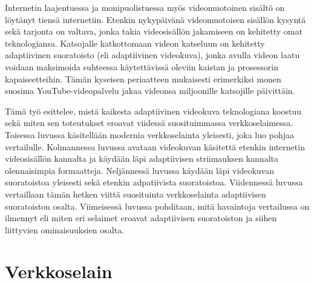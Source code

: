 \documentclass[finnish, 12pt, a4paper, elec, utf8, a-1b, online]{aaltothesis}
\begin{document}
  Internetin laajentuessa ja monipuolistuessa myös videomuotoinen sisältö on löytänyt tiensä internetiin. Etenkin nykypäivänä videomuotoisen sisällön kysyntä sekä tarjonta on valtava, jonka takia videosisällön jakamiseen on kehitetty omat teknologiansa. Katsojalle katkottomaan videon katseluun on kehitetty adaptiivinen suoratoisto (eli adaptiivinen videokuva), jonka avulla videon laatu voidaan maksimoida suhteessa käytettävissä oleviin kaistan ja prosessorin kapaiseetteihin. Tämän kyseisen periaatteen mukaisesti erimerkiksi monen suosima YouTube-videopalvelu jakaa videonsa miljoonille katsojille päivittäin.

  Tämä työ esittelee, mistä kaikesta adaptiivinen videokuva teknologiana koostuu sekä miten sen toteutukset eroavat viidessä suosituimmassa verkkoselaimessa. Toisessa luvussa käsitellään modernia verkkoselainta yleisesti, joka luo pohjaa vertailulle. Kolmannessa luvussa avataan videokuvan käsitettä etenkin internetin videosisällön kannalta ja käydään läpi adaptiivisen striimauksen kannalta olennaisimpia formaatteja. Neljännessä luvussa käydään läpi videokuvan suoratoistoa yleisesti sekä etenkin adpatiivista suoratoistoa. Viidennessä luvussa vertaillaan tämän hetken viittä suosituinta verkkoselainta adaptiivisen suoratoiston osalta. Viimeisessä luvussa pohditaan, mitä havaintoja vertailussa on ilmennyt eli miten eri selaimet eroavat adaptiivisen suoratoiston ja siihen liittyvien ominaisuuksien osalta.

\clearpage



\section{Verkkoselain}
\end{document}
